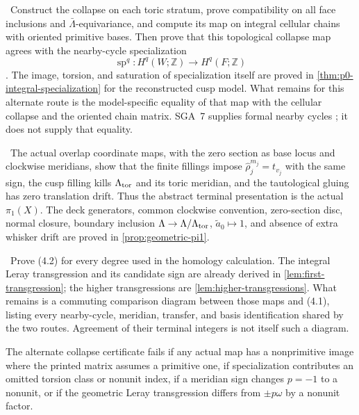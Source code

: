 \begin{obligation}
\label{obl:cusp-collapse}
\Open\ Construct the collapse on each toric stratum, prove compatibility on
all face inclusions and $\bar\Lambda$-equivariance, and compute its map on
integral cellular chains with oriented primitive bases.  Then prove that this
topological collapse map agrees with the nearby-cycle specialization
\[
\operatorname{sp}^q:H^q(W;\mathbb Z)\longrightarrow H^q(F;\mathbb Z)
\].
The image, torsion, and saturation of specialization itself are proved in
\cref{thm:p0-integral-specialization} for the reconstructed cusp model.
What remains for this alternate route is the
model-specific equality of that map with the cellular collapse and the
oriented chain matrix.  SGA~7 supplies formal nearby cycles
\cite{SGA7II1973}; it does not supply that equality.
\end{obligation}

\begin{obligation}
\label{obl:vankampen}
\Verified\ The actual overlap coordinate maps, with the zero section as
base locus and clockwise meridians, show that the
finite fillings impose $\widehat\rho_j^{m_j}=t_{v_j}$ with the same sign,
the cusp filling kills $\Lambda_{\rm tor}$ and its toric meridian, and the
tautological gluing has zero translation drift.  Thus the abstract terminal
presentation is the actual $\pi_1(X)$.  The deck generators, common clockwise
convention, zero-section disc, normal closure, boundary inclusion
$\Lambda\to\Lambda/\Lambda_{\rm tor}$,
$\widetilde a_0\mapsto1$, and absence of extra whisker drift are proved in
\cref{prop:geometric-pi1}.
\end{obligation}

\begin{obligation}
\label{obl:leray}
\Open\ Prove (4.2) for every degree used in the homology calculation.
The integral Leray transgression and its candidate sign are already derived
in \cref{lem:first-transgression}; the higher transgressions are
\cref{lem:higher-transgressions}.  What remains is a commuting comparison
diagram between those maps and (4.1), listing every
nearby-cycle, meridian, transfer, and basis identification shared by the two
routes.  Agreement of their terminal integers is not itself such a diagram.
\end{obligation}

\begin{test}
The alternate collapse certificate fails if any actual map has a
nonprimitive image where
the printed matrix assumes a primitive one, if specialization contributes an
omitted torsion class or nonunit index, if a meridian sign changes $p=-1$ to
a nonunit, or if the geometric Leray transgression differs from
$\pm p\omega$ by a nonunit factor.
\end{test}

